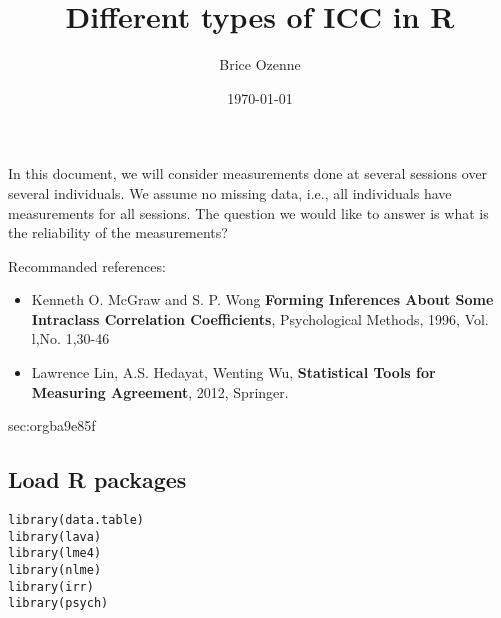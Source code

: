 \documentclass[12pt]{article}
\author{Brice Ozenne}
\date{\today}
\title{Different types of ICC in R}
\begin{document}
\maketitle
In this document, we will consider measurements done at several
sessions over several individuals. We assume no missing data, i.e.,
all individuals have measurements for all sessions. The question we
would like to answer is what is the reliability of the measurements?

\begingroup
\renewcommand{\section}[2]{}
\tableofcontents
\endgroup

\clearpage

Recommanded references: 
\begin{itemize}
\item Kenneth O. McGraw and S. P. Wong \textbf{Forming Inferences About Some Intraclass Correlation Coefficients}, Psychological Methods, 1996, Vol. l,No. 1,30-46
\item Lawrence Lin, A.S. Hedayat, Wenting Wu, \textbf{Statistical Tools for Measuring Agreement}, 2012, Springer.
\end{itemize}

\clearpage

\section{Preparation}
\label{sec:orgba9e85f}

\lstset{style=code-tiny}

\subsection{Load R packages}
\label{sec:org1b70b00}
\lstset{language=r,label= ,caption= ,captionpos=b,numbers=none}
\begin{lstlisting}
library(data.table)
library(lava)
library(lme4)
library(nlme)
library(irr)
library(psych)
\end{lstlisting}
\end{document}
